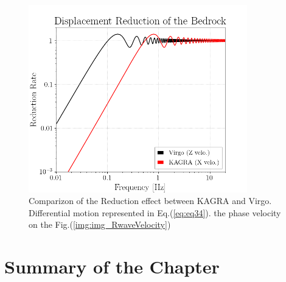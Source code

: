 \documentclass[a4paper,12pt]{book}
\begin{document}
\subsubsection{}


\begin{figure}[H]
  \begin{center}
    \includegraphics[width=9.5cm]{./img_CDMR.png}
  \end{center}
  \caption{Comparizon of the Reduction effect between KAGRA and Virgo. Differential motion represented in Eq.(\ref{eq:eq34}).   the phase velocity on the Fig.(\ref{img:img_RwaveVelocity})}
  \label{img:img_dmrr}
\end{figure}


\section{Summary of the Chapter}

\appendix


\end{document}
